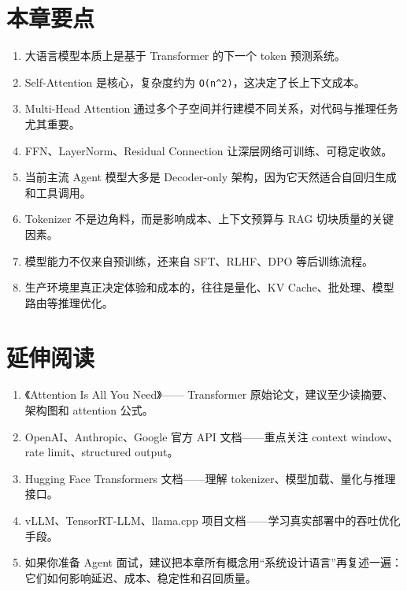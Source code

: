 \section{本章要点}

\begin{enumerate}[leftmargin=2em]
\item 大语言模型本质上是基于 Transformer 的下一个 token 预测系统。
\item Self-Attention 是核心，复杂度约为 \texttt{O(n\textasciicircum{}2)}，这决定了长上下文成本。
\item Multi-Head Attention 通过多个子空间并行建模不同关系，对代码与推理任务尤其重要。
\item FFN、LayerNorm、Residual Connection 让深层网络可训练、可稳定收敛。
\item 当前主流 Agent 模型大多是 Decoder-only 架构，因为它天然适合自回归生成和工具调用。
\item Tokenizer 不是边角料，而是影响成本、上下文预算与 RAG 切块质量的关键因素。
\item 模型能力不仅来自预训练，还来自 SFT、RLHF、DPO 等后训练流程。
\item 生产环境里真正决定体验和成本的，往往是量化、KV Cache、批处理、模型路由等推理优化。
\end{enumerate}

\section{延伸阅读}

\begin{enumerate}[leftmargin=2em]
\item 《Attention Is All You Need》------ Transformer 原始论文，建议至少读摘要、架构图和 attention 公式。
\item OpenAI、Anthropic、Google 官方 API 文档------重点关注 context window、rate limit、structured output。
\item Hugging Face Transformers 文档------理解 tokenizer、模型加载、量化与推理接口。
\item vLLM、TensorRT-LLM、llama.cpp 项目文档------学习真实部署中的吞吐优化手段。
\item 如果你准备 Agent 面试，建议把本章所有概念用``系统设计语言''再复述一遍：它们如何影响延迟、成本、稳定性和召回质量。
\end{enumerate}
